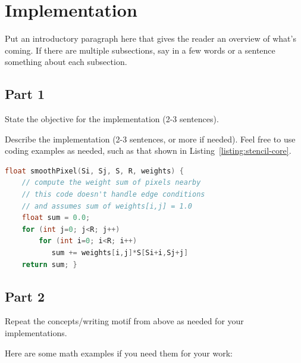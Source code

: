 
\section{Implementation}
\label{sec:implementation}


Put an introductory paragraph here that gives the reader an overview of what's coming. If there are multiple subsections, say in a few words or a sentence something about each subsection.

\subsection{Part 1}

State  the objective for the implementation (2-3 sentences).

Describe the implementation (2-3 sentences, or more if needed). Feel free to use coding examples as needed, such as that shown in Listing~\ref{listing:stencil-core}.

\begin{lstlisting}[caption={Stencil computation in 2D: performs sum of product of nearby pixels with weights.},label={listing:stencil-core}, name=stencil-core, float=h, style=mystyle,language=C++]
float smoothPixel(Si, Sj, S, R, weights) {
    // compute the weight sum of pixels nearby
    // this code doesn't handle edge conditions
    // and assumes sum of weights[i,j] = 1.0 
    float sum = 0.0;
    for (int j=0; j<R; j++)
        for (int i=0; i<R; i++)
           sum += weights[i,j]*S[Si+i,Sj+j]
    return sum; }
\end{lstlisting}

\subsection{Part 2}

Repeat the concepts/writing motif from above as needed for your implementations.

Here are some math examples if you need them for your work:



